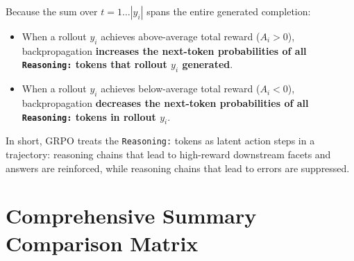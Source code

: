 \documentclass[10pt,letterpaper]{article}
\begin{document}
Because the sum over $t=1 \dots |y_i|$ spans the entire generated completion:
\begin{itemize}[leftmargin=18pt, itemsep=2pt]
    \item When a rollout $y_i$ achieves above-average total reward ($A_i > 0$), backpropagation \textbf{increases the next-token probabilities of all \texttt{Reasoning:} tokens that rollout $y_i$ generated}.
    \item When a rollout $y_i$ achieves below-average total reward ($A_i < 0$), backpropagation \textbf{decreases the next-token probabilities of all \texttt{Reasoning:} tokens in rollout $y_i$}.
\end{itemize}
In short, GRPO treats the \texttt{Reasoning:} tokens as latent action steps in a trajectory: reasoning chains that lead to high-reward downstream facets and answers are reinforced, while reasoning chains that lead to errors are suppressed.

\section{Comprehensive Summary Comparison Matrix}
\end{document}
